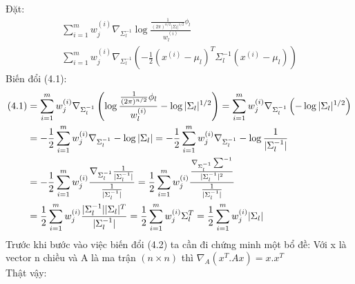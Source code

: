 Đặt:
\begin{align}
\sum_{i=1}^{m} w_{j}^{(i)} \nabla_{\Sigma_l^{-1}} \log
\frac{\frac{1}{(2\pi)^{n/2}|\Sigma_l|^{1/2}}\phi_l }{w_{l}^{(i)}}\\
\sum_{i=1}^{m} w_{j}^{(i)} \nabla_{\Sigma_l^{-1}} \left( -\frac{1}{2}
(x^{(i)}-\mu_l)^T \Sigma_l^{-1} (x^{(i)}-\mu_l) \right)
\end{align}
Biến đổi (4.1):
\begin{align}
(4.1)& = \sum_{i=1}^{m} w_{j}^{(i)} \nabla_{\Sigma_l^{-1}} \left( \log
\frac{\frac{1}{(2\pi)^{n/2}}\phi_l }{w_{l}^{(i)}} - \log |\Sigma_l|^{1/2} \right)
= \sum_{i=1}^{m} w_{j}^{(i)} \nabla_{\Sigma_l^{-1}} \left( -\log |\Sigma_l|^{1/2}
\right)\notag\\
& = -\frac{1}{2} \sum_{i=1}^{m} w_{j}^{(i)} \nabla_{\Sigma_l^{-1}} -\log
|\Sigma_l| = -\frac{1}{2} \sum_{i=1}^{m} w_{j}^{(i)} \nabla_{\Sigma_l^{-1}} -\log
\frac{1}{|\Sigma_l^{-1}|}\notag\\ 
& = -\frac{1}{2} \sum_{i=1}^{m} w_{j}^{(i)}
\frac{\nabla_{\Sigma_l^{-1}}
\frac{1}{|\Sigma_l^{-1}|}}{\frac{1}{|\Sigma_l^{-1}|}} = \frac{1}{2} \sum_{i=1}^{m}
w_{j}^{(i)} \frac{\frac{\nabla_{\Sigma_l^{-1}}
\sum^{-1}}{|\Sigma_l^{-1}|^2}}{\frac{1}{|\Sigma_l^{-1}|}}\notag\\ 
& = \frac{1}{2}
\sum_{i=1}^{m} w_{j}^{(i)} \frac{|\Sigma_l^{-1}||\Sigma_l|^T}{|\Sigma_l^{-1}|} = \frac{1}{2}
\sum_{i=1}^{m} w_{j}^{(i)}\Sigma_l^T = \frac{1}{2}
\sum_{i=1}^{m} w_{j}^{(i)}|\Sigma_l|\notag
\end{align}
Trước khi bước vào việc biến đổi (4.2) ta cần đi chứng minh một bổ đề:
Với x là vector n chiều và A là ma trận $(n\times n)$ thì
$\nabla_A(x^T.Ax)=x.x^T$\\
Thật vậy:
